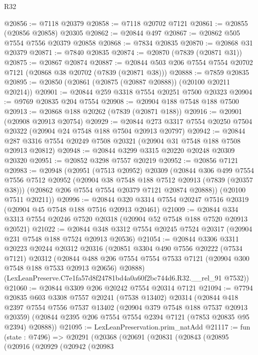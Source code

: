 \begin{lexlean}{R32}
\begin{coremodule}
@20856 := @7118 @20379
@20858 := @7118 @20702 @7121
@20861 := @20855 (@20856 @20858) @20305
@20862 := @20844 @497
@20867 := @20862 @505 @7554 @7556 @20379 @20858
@20868 := @7834 @20835
@20870 := @20868 @31 @20379
@20871 := @7840 @20835
@20874 := @20870 (@7839 (@20871 @31))
@20875 := @20867 @20874
@20887 := @20844 @503 @206 @7554 @7554 @20702 @7121 (@20868 @38 @20702 (@7839 (@20871 @38)))
@20888 := @7859 @20835
@20895 := @20850 (@20861 (@20875 (@20887 @20888)) (@20100 @20211 @20214))
@20901 := @20844 @259 @3318 @7554 @20251 @7500 @20323
@20904 := @9769 @20835 @204 @7554
@20908 := @20904 @188 @7548 @188 @7500
@20913 := @20868 @188 @20262 (@7839 (@20871 @188))
@20916 := @20901 (@20908 @20913 @20754)
@20929 := @20844 @273 @3317 @7554 @20250 @7504 @20322 (@20904 @24 @7548 @188 @7504 @20913 @20797)
@20942 := @20844 @287 @3316 @7554 @20249 @7508 @20321 (@20904 @31 @7548 @188 @7508 @20913 @20812)
@20948 := @20844 @3299 @3315 @20220 @20248 @20309 @20320
@20951 := @20852 @3298 @7557 @20219
@20952 := @20856 @7121
@20983 := @20948
    (@20951
      (@7513 @20952)
      @20309
      (@20844
        @306
        @499
        @7554
        @7556
        @7512
        @20952
        (@20904 @38 @7548 @188 @7512 @20913 (@7839 (@20357 @38)))
        (@20862 @206 @7554 @7554 @20379 @7121 @20874 @20888))
      (@20100 @7511 @20211))
@20996 := @20844 @320 @3314 @7554 @20247 @7516 @20319 (@20904 @45 @7548 @188 @7516 @20913 @20461)
@21009 := @20844 @334 @3313 @7554 @20246 @7520 @20318 (@20904 @52 @7548 @188 @7520 @20913 @20521)
@21022 := @20844 @348 @3312 @7554 @20245 @7524 @20317 (@20904 @231 @7548 @188 @7524 @20913 @20536)
@21054 := @20844
    @3306
    @3311
    @20223
    @20244
    @20312
    @20316
    (@20851
      @3304
      @490
      @7556
      @20222
      (@7534 @7121)
      @20312
      (@20844 @488 @206 @7554 @7554 @7533 @7121 (@20904 @300 @7548 @188 @7533 @20913 @20656) @20888)
      (LexLeanPreserve.C7e1fa57d8f24781bd4a0a60f2bc744d6.R32.__rel_91 @7532))
@21060 := @20844 @3309 @206 @20242 @7554 @20314 @7121
@21094 := @7794
    @20835
    @603
    @3308
    @7557
    @20241
    (@7538 @13402)
    @20314
    (@20844
      @418
      @2397
      @7554
      @7556
      @7537
      @13402
      (@20904 @379 @7548 @188 @7537 @20913 @20359)
      (@20844 @2395 @206 @7554 @7554 @2394 @7121 (@7853 @20835 @95 @2394) @20888))
@21095 := LexLeanPreservation.prim_natAdd
@21117 := fun (state : @7496) =>
  @20291
    (@20368
      (@20691
        (@20831
          (@20843
            (@20895
              (@20916
                (@20929
                  (@20942
                    (@20983

\end{coremodule}
\end{lexlean}
